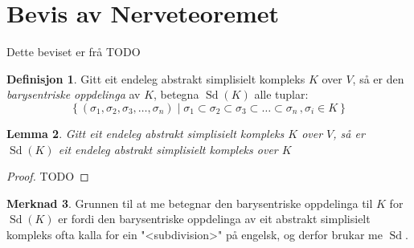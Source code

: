 \documentclass[a4paper, titlepage, 12pt, norsk]{article}
\theoremstyle{plain}
\newtheorem{theorem}{Teorem}[section]
\newtheorem{lemma}[theorem]{Lemma}
\theoremstyle{definition}
\newtheorem{definition}[theorem]{Definisjon}
\newtheorem{remark}[theorem]{Merknad}
\newcommand{\Nc}{\mathcal{N}}
\newcommand{\intersect}{ \mathop{\cap}\limits } %
\newcommand{\gr}[1]{ \lvert #1 \rvert } %
\newcommand{\set}[1]{ \left \{ #1 \right \} } %
\DeclareMathOperator{\Sd}{Sd}
\begin{document}
%	

%
%

\section{Bevis av Nerveteoremet}

Dette beviset er frå TODO

\begin{definition}
	Gitt eit endeleg abstrakt simplisielt kompleks \( K \) over \( V \), så er den \emph{barysentriske oppdelinga} av \( K \), betegna \( \Sd(K) \) alle tuplar: 
	\[
		\set{(\sigma_1, \sigma_2, \sigma_3, \dots, \sigma_n) \mid \sigma_1 \subset \sigma_2 \subset \sigma_3 \subset \dots \subset \sigma_n\,, \sigma_i \in K}
	\]
\end{definition}

\begin{lemma}
	Gitt eit endeleg abstrakt simplisielt kompleks \( K \) over \( V \), så er \( \Sd(K) \) eit endeleg abstrakt simplisielt kompleks over \( K \)
\end{lemma}

\begin{proof}
	TODO
\end{proof}

\begin{remark}
	Grunnen til at me betegnar den barysentriske oppdelinga til \( K \) for \( \Sd(K) \) er fordi den barysentriske oppdelinga av eit abstrakt simplisielt kompleks ofta kalla for ein "<subdivision>" på engelsk, og derfor brukar me \( \Sd \).
\end{remark}
\end{document}
